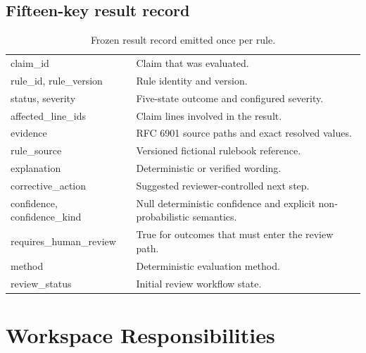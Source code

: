 \documentclass[11pt,a4paper,oneside]{report}
\begin{document}
\section{Fifteen-key result record}

\begin{table}[H]
\centering
\begin{tabularx}{\textwidth}{>{\ttfamily}p{44mm} X}
\toprule
claim\_id & Claim that was evaluated.\\
rule\_id, rule\_version & Rule identity and version.\\
status, severity & Five-state outcome and configured severity.\\
affected\_line\_ids & Claim lines involved in the result.\\
evidence & RFC 6901 source paths and exact resolved values.\\
rule\_source & Versioned fictional rulebook reference.\\
explanation & Deterministic or verified wording.\\
corrective\_action & Suggested reviewer-controlled next step.\\
confidence, confidence\_kind & Null deterministic confidence and explicit non-probabilistic semantics.\\
requires\_human\_review & True for outcomes that must enter the review path.\\
method & Deterministic evaluation method.\\
review\_status & Initial review workflow state.\\
\bottomrule
\end{tabularx}
\caption{Frozen result record emitted once per rule.}
\end{table}

\chapter{Workspace Responsibilities}
\end{document}
